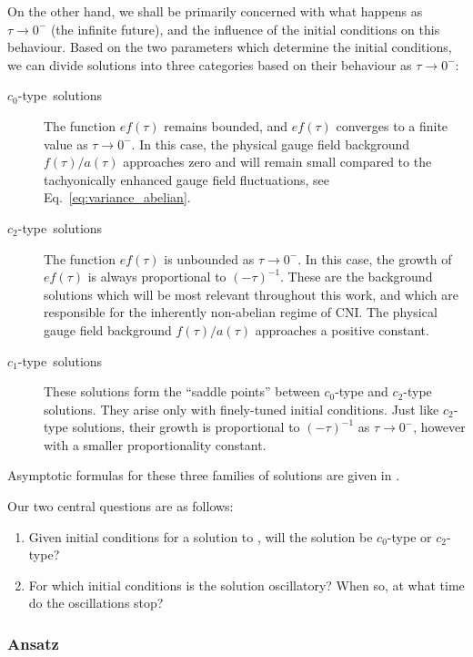 On the other hand, we shall be primarily concerned with what happens as $\tau\to0^{-}$ (the infinite future), and the influence of the initial conditions on this behaviour. Based on the two parameters which determine the initial conditions, we can divide solutions into three categories based on their behaviour as $\tau\to0^{-}$:
\begin{description}
\item [{$c_{0}$\nobreakdash-type~solutions}] \label{c0typesol} The function $ef(\tau)$ remains bounded, and $ef(\tau)$ converges to a finite value as $\tau\to0^{-}$. In this case, the physical gauge field background $f(\tau)/a(\tau)$ approaches zero and will remain small compared to the tachyonically enhanced gauge field fluctuations, see Eq.~\eqref{eq:variance_abelian}. 
\item [{$c_{2}$\nobreakdash-type~solutions}] The function $ef(\tau)$ is unbounded as $\tau\to0^{-}$. In this case, the growth of $ef(\tau)$ is always proportional to $(-\tau)^{-1}$. These are the background solutions which will be most relevant throughout this work, and which are responsible for the inherently non-abelian regime of CNI. The physical gauge field background $f(\tau)/a(\tau)$ approaches a positive constant.
\item [{$c_{1}$\nobreakdash-type~solutions}] These solutions form the ``saddle points'' between $c_{0}$\nobreakdash-type and $c_{2}$\nobreakdash-type solutions. They arise only with finely-tuned initial conditions. Just like $c_{2}$\nobreakdash-type solutions, their growth is proportional to $(-\tau)^{-1}$ as $\tau\to0^{-}$, however with a smaller proportionality constant. 
\end{description}
Asymptotic formulas for these three families of solutions are given in .

Our two central questions are as follows: 
\begin{enumerate}
\item Given initial conditions for a solution to , will the solution be $c_{0}$\nobreakdash-type or $c_{2}$\nobreakdash-type? 
\item For which initial conditions is the solution oscillatory? When so, at what time do the oscillations stop? \label{enu:central-questions} 
\end{enumerate}

\subsubsection*{Ansatz}

